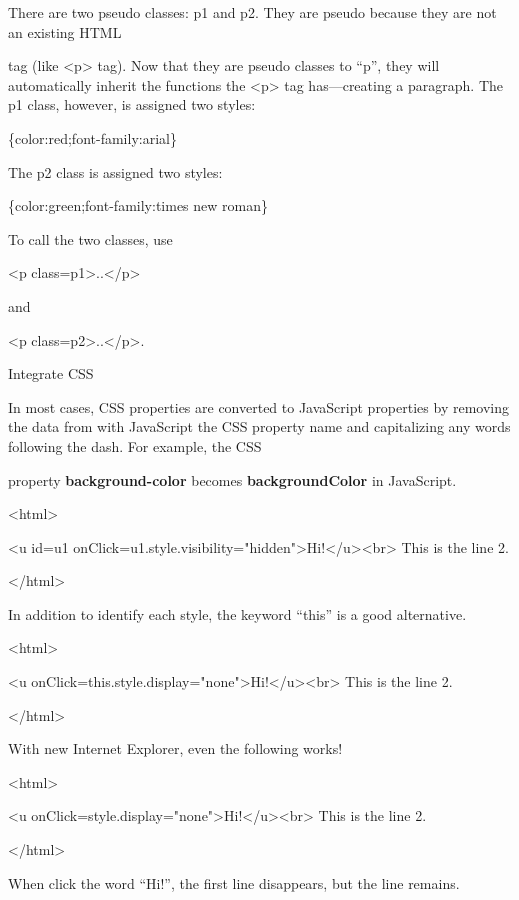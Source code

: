 \documentclass[
]{article}
\begin{document}
There are two pseudo classes: p1 and p2. They are pseudo because they
are not an existing HTML

tag (like \textless p\textgreater{} tag). Now that they are pseudo
classes to ``p'', they will automatically inherit the functions the
\textless p\textgreater{} tag has---creating a paragraph. The p1 class,
however, is assigned two styles:

\{color:red;font-family:arial\}

The p2 class is assigned two styles:

\{color:green;font-family:times new roman\}

To call the two classes, use

\textless p class=p1\textgreater..\textless/p\textgreater{}

and

\textless p class=p2\textgreater..\textless/p\textgreater.

Integrate CSS

In most cases, CSS properties are converted to JavaScript properties by
removing the data from with JavaScript the CSS property name and
capitalizing any words following the dash. For example, the CSS

property \textbf{background-color} becomes \textbf{backgroundColor} in
JavaScript.

\textless html\textgreater{}

\textless u id=u1
onClick=u1.style.visibility="hidden"\textgreater Hi!\textless/u\textgreater\textless br\textgreater{}
This is the line 2.

\textless/html\textgreater{}

In addition to identify each style, the keyword ``this'' is a good
alternative.

\textless html\textgreater{}

\textless u
onClick=this.style.display="none"\textgreater Hi!\textless/u\textgreater\textless br\textgreater{}
This is the line 2.

\textless/html\textgreater{}

With new Internet Explorer, even the following works!

\textless html\textgreater{}

\textless u
onClick=style.display="none"\textgreater Hi!\textless/u\textgreater\textless br\textgreater{}
This is the line 2.

\textless/html\textgreater{}

When click the word ``Hi!'', the first line disappears, but the line
remains.
\end{document}
